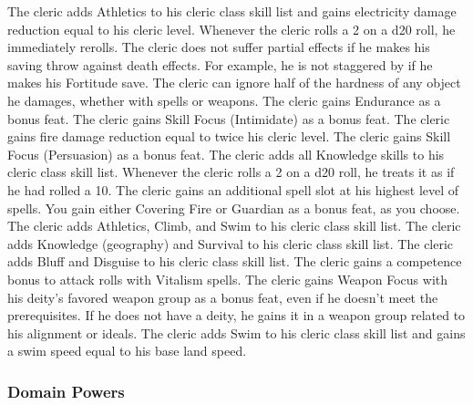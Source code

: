  The cleric adds Athletics to his cleric class skill list and gains electricity damage reduction equal to his cleric level.
 Whenever the cleric rolls a 2 on a d20 roll, he immediately rerolls.
 The cleric does not suffer partial effects if he makes his saving throw against death effects. For example, he is not staggered by  if he makes his Fortitude save.
 The cleric can ignore half of the hardness of any object he damages, whether with spells or weapons.
 The cleric gains Endurance as a bonus feat.
 The cleric gains Skill Focus (Intimidate) as a bonus feat.
 The cleric gains fire damage reduction equal to twice his cleric level.
 The cleric gains Skill Focus (Persuasion) as a bonus feat.
 The cleric adds all Knowledge skills to his cleric class skill list.
 Whenever the cleric rolls a 2 on a d20 roll, he treats it as if he had rolled a 10.
 The cleric gains an additional spell slot at his highest level of spells.
 You gain either Covering Fire or Guardian as a bonus feat, as you choose.
 The cleric adds Athletics, Climb, and Swim to his cleric class skill list.
 The cleric adds Knowledge (geography) and Survival to his cleric class skill list.
 The cleric adds Bluff and Disguise to his cleric class skill list.
 The cleric gains a  competence bonus to attack rolls with Vitalism spells.
 The cleric gains Weapon Focus with his deity's favored weapon group as a bonus feat, even if he doesn't meet the prerequisites. If he does not have a deity, he gains it in a weapon group related to his alignment or ideals.
 The cleric adds Swim to his cleric class skill list and gains a swim speed equal to his base land speed.

\subsubsection{Domain Powers}\label{Domain Powers}

